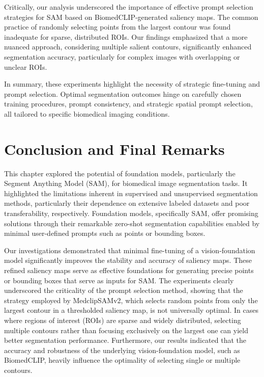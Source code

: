 \documentclass[./dissertation.tex]{subfiles}
\begin{document}
Critically, our analysis underscored the importance of effective prompt selection strategies for SAM based on BiomedCLIP-generated saliency maps. The common practice of randomly selecting points from the largest contour was found inadequate for sparse, distributed ROIs. Our findings emphasized that a more nuanced approach, considering multiple salient contours, significantly enhanced segmentation accuracy, particularly for complex images with overlapping or unclear ROIs.

In summary, these experiments highlight the necessity of strategic fine-tuning and prompt selection. Optimal segmentation outcomes hinge on carefully chosen training procedures, prompt consistency, and strategic spatial prompt selection, all tailored to specific biomedical imaging conditions.

\section{Conclusion and Final Remarks}

This chapter explored the potential of foundation models, particularly the Segment Anything Model (SAM), for biomedical image segmentation tasks. It highlighted the limitations inherent in supervised and unsupervised segmentation methods, particularly their dependence on extensive labeled datasets and poor transferability, respectively. Foundation models, specifically SAM, offer promising solutions through their remarkable zero-shot segmentation capabilities enabled by minimal user-defined prompts such as points or bounding boxes.

Our investigations demonstrated that minimal fine-tuning of a vision-foundation model significantly improves the stability and accuracy of saliency maps. These refined saliency maps serve as effective foundations for generating precise points or bounding boxes that serve as inputs for SAM. The experiments clearly underscored the criticality of the prompt selection method, showing that the strategy employed by MedclipSAMv2, which selects random points from only the largest contour in a thresholded saliency map, is not universally optimal. In cases where regions of interest (ROIs) are sparse and widely distributed, selecting multiple contours rather than focusing exclusively on the largest one can yield better segmentation performance. Furthermore, our results indicated that the accuracy and robustness of the underlying vision-foundation model, such as BiomedCLIP, heavily influence the optimality of selecting single or multiple contours.
\end{document}
